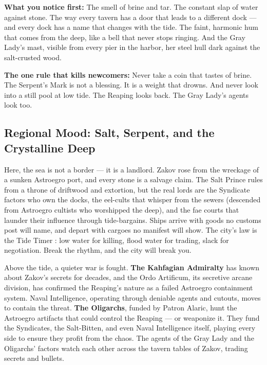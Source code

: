 \documentclass[12pt,oneside]{book}
\begin{document}
\begin{tcolorbox}[colback=black!3,colframe=blue!60!black,title={Theme \& Atmosphere},breakable]
\vspace{2mm}
\textbf{What you notice first:} The smell of brine and tar. The constant slap of water against stone. The way every tavern has a door that leads to a different dock --- and every dock has a name that changes with the tide. The faint, harmonic hum that comes from the deep, like a bell that never stops ringing. And the Gray Lady's mast, visible from every pier in the harbor, her steel hull dark against the salt-crusted wood.

\textbf{The one rule that kills newcomers:} Never take a coin that tastes of brine. The Serpent's Mark is not a blessing. It is a weight that drowns. And never look into a still pool at low tide. The Reaping looks back. The Gray Lady's agents look too.
\end{tcolorbox}

\subsection*{Regional Mood: Salt, Serpent, and the Crystalline Deep}

Here, the sea is not a border --- it is a landlord. Zakov rose from the wreckage of a sunken Astroegro port, and every stone is a salvage claim. The Salt Prince rules from a throne of driftwood and extortion, but the real lords are the Syndicate factors who own the docks, the eel-cults that whisper from the sewers (descended from Astroegro cultists who worshipped the deep), and the fae courts that launder their influence through tide-bargains. Ships arrive with goods no customs post will name, and depart with cargoes no manifest will show. The city's law is the Tide Timer : low water for killing, flood water for trading, slack for negotiation. Break the rhythm, and the city will break you.

Above the tide, a quieter war is fought. \textbf{The Kahfagian Admiralty} has known about Zakov's secrets for decades, and the Ordo Artificum, its secretive arcane division, has confirmed the Reaping's nature as a failed Astroegro containment system. Naval Intelligence, operating through deniable agents and cutouts, moves to contain the threat. \textbf{The Oligarchs}, funded by Patron Alaric, hunt the Astroegro artifacts that could control the Reaping --- or weaponize it. They fund the Syndicates, the Salt-Bitten, and even Naval Intelligence itself, playing every side to ensure they profit from the chaos. The agents of the Gray Lady and the Oligarchs' factors watch each other across the tavern tables of Zakov, trading secrets and bullets.
\end{document}
